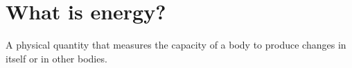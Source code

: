 %
%

\raggedbottom %

\section{What is energy?}

\begin{definition}[Energy]
    A physical quantity that measures the capacity of a body to produce changes in itself or in other bodies.
\end{definition}

